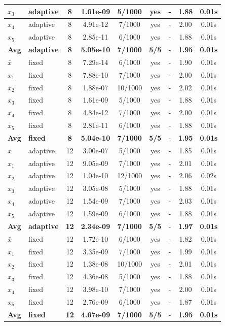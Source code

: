 \begin{longtable}{|l|l|c|c|c|c|c|c|c|}
\hline
$x_3$ & adaptive & 8 & 1.61e-09 & 5/1000 & yes & - & 1.88 & 0.01s \\
\hline
$x_4$ & adaptive & 8 & 4.91e-12 & 7/1000 & yes & - & 2.00 & 0.01s \\
\hline
$x_5$ & adaptive & 8 & 2.85e-11 & 6/1000 & yes & - & 1.88 & 0.01s \\
\hline
\hline\hline
\textbf{Avg} & \textbf{adaptive} & \textbf{8} & \textbf{5.05e-10} & \textbf{7/1000} & \textbf{5/5} & - & \textbf{1.95} & \textbf{0.01s} \\
\hline\hline
\hline
$\bar{x}$ & fixed & 8 & 7.29e-14 & 6/1000 & yes & - & 1.90 & 0.01s \\
\hline
$x_1$ & fixed & 8 & 7.88e-10 & 7/1000 & yes & - & 2.00 & 0.01s \\
\hline
$x_2$ & fixed & 8 & 1.88e-07 & 10/1000 & yes & - & 2.02 & 0.01s \\
\hline
$x_3$ & fixed & 8 & 1.61e-09 & 5/1000 & yes & - & 1.88 & 0.01s \\
\hline
$x_4$ & fixed & 8 & 4.84e-12 & 7/1000 & yes & - & 2.00 & 0.01s \\
\hline
$x_5$ & fixed & 8 & 2.81e-11 & 6/1000 & yes & - & 1.88 & 0.01s \\
\hline
\hline\hline
\textbf{Avg} & \textbf{fixed} & \textbf{8} & \textbf{5.04e-10} & \textbf{7/1000} & \textbf{5/5} & - & \textbf{1.95} & \textbf{0.01s} \\
\hline\hline
$\bar{x}$ & adaptive & 12 & 3.00e-07 & 5/1000 & yes & - & 1.85 & 0.01s \\
\hline
$x_1$ & adaptive & 12 & 9.05e-09 & 7/1000 & yes & - & 2.01 & 0.01s \\
\hline
$x_2$ & adaptive & 12 & 1.04e-10 & 12/1000 & yes & - & 2.06 & 0.02s \\
\hline
$x_3$ & adaptive & 12 & 3.05e-08 & 5/1000 & yes & - & 1.88 & 0.01s \\
\hline
$x_4$ & adaptive & 12 & 1.54e-09 & 7/1000 & yes & - & 2.03 & 0.01s \\
\hline
$x_5$ & adaptive & 12 & 1.59e-09 & 6/1000 & yes & - & 1.88 & 0.01s \\
\hline
\hline\hline
\textbf{Avg} & \textbf{adaptive} & \textbf{12} & \textbf{2.34e-09} & \textbf{7/1000} & \textbf{5/5} & - & \textbf{1.97} & \textbf{0.01s} \\
\hline\hline
\hline
$\bar{x}$ & fixed & 12 & 1.72e-10 & 6/1000 & yes & - & 1.82 & 0.01s \\
\hline
$x_1$ & fixed & 12 & 3.35e-09 & 7/1000 & yes & - & 1.99 & 0.01s \\
\hline
$x_2$ & fixed & 12 & 1.38e-08 & 10/1000 & yes & - & 2.01 & 0.01s \\
\hline
$x_3$ & fixed & 12 & 4.36e-08 & 5/1000 & yes & - & 1.88 & 0.01s \\
\hline
$x_4$ & fixed & 12 & 3.98e-10 & 7/1000 & yes & - & 2.00 & 0.01s \\
\hline
$x_5$ & fixed & 12 & 2.76e-09 & 6/1000 & yes & - & 1.87 & 0.01s \\
\hline
\hline\hline
\textbf{Avg} & \textbf{fixed} & \textbf{12} & \textbf{4.67e-09} & \textbf{7/1000} & \textbf{5/5} & - & \textbf{1.95} & \textbf{0.01s} \\
\hline\hline
\end{longtable}
